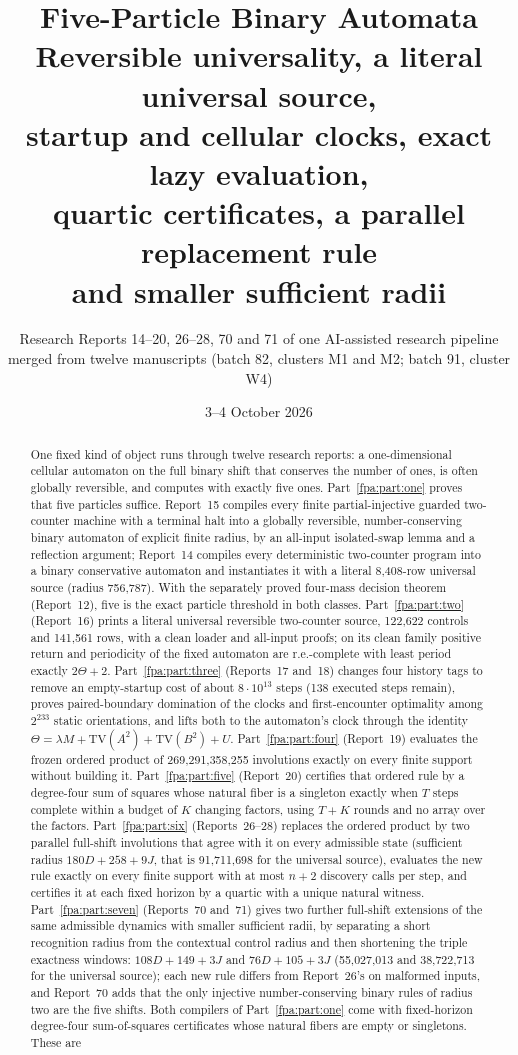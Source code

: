 \documentclass[11pt,a4paper]{article}
\title{Five-Particle Binary Automata\\[6pt]\large Reversible universality, a literal universal source,\\startup and cellular clocks, exact lazy evaluation,\\quartic certificates, a parallel replacement rule\\and smaller sufficient radii}
\author{Research Reports 14--20, 26--28, 70 and 71 of one AI-assisted research pipeline\\\small merged from twelve manuscripts (batch 82, clusters M1 and M2; batch 91, cluster W4)}
\date{3--4 October 2026}
\numberwithin{equation}{section}
\begin{document}
\maketitle
\thispagestyle{empty}
\begin{abstract}
One fixed kind of object runs through twelve research reports: a one-dimensional cellular automaton on the full binary shift that conserves the number of ones, is often globally reversible, and computes with exactly five ones. Part~\ref{fpa:part:one} proves that five particles suffice. Report~15 compiles every finite partial-injective guarded two-counter machine with a terminal halt into a globally reversible, number-conserving binary automaton of explicit finite radius, by an all-input isolated-swap lemma and a reflection argument; Report~14 compiles every deterministic two-counter program into a binary conservative automaton and instantiates it with a literal 8,408-row universal source (radius 756,787). With the separately proved four-mass decision theorem (Report~12), five is the exact particle threshold in both classes. Part~\ref{fpa:part:two} (Report~16) prints a literal universal reversible two-counter source, 122,622 controls and 141,561 rows, with a clean loader and all-input proofs; on its clean family positive return and periodicity of the fixed automaton are r.e.-complete with least period exactly $2\Theta+2$. Part~\ref{fpa:part:three} (Reports~17 and~18) changes four history tags to remove an empty-startup cost of about $8\cdot10^{13}$ steps (138 executed steps remain), proves paired-boundary domination of the clocks and first-encounter optimality among $2^{233}$ static orientations, and lifts both to the automaton's clock through the identity $\Theta=\lambda M+\mathrm{TV}(A^2)+\mathrm{TV}(B^2)+U$. Part~\ref{fpa:part:four} (Report~19) evaluates the frozen ordered product of 269,291,358,255 involutions exactly on every finite support without building it. Part~\ref{fpa:part:five} (Report~20) certifies that ordered rule by a degree-four sum of squares whose natural fiber is a singleton exactly when $T$ steps complete within a budget of $K$ changing factors, using $T+K$ rounds and no array over the factors. Part~\ref{fpa:part:six} (Reports~26--28) replaces the ordered product by two parallel full-shift involutions that agree with it on every admissible state (sufficient radius $180D+258+9J$, that is 91,711,698 for the universal source), evaluates the new rule exactly on every finite support with at most $n+2$ discovery calls per step, and certifies it at each fixed horizon by a quartic with a unique natural witness. Part~\ref{fpa:part:seven} (Reports~70 and~71) gives two further full-shift extensions of the same admissible dynamics with smaller sufficient radii, by separating a short recognition radius from the contextual control radius and then shortening the triple exactness windows: $108D+149+3J$ and $76D+105+3J$ (55,027,013 and 38,722,713 for the universal source); each new rule differs from Report~26's on malformed inputs, and Report~70 adds that the only injective number-conserving binary rules of radius two are the five shifts. Both compilers of Part~\ref{fpa:part:one} come with fixed-horizon degree-four sum-of-squares certificates whose natural fibers are empty or singletons. These are 
\end{abstract}
\end{document}
